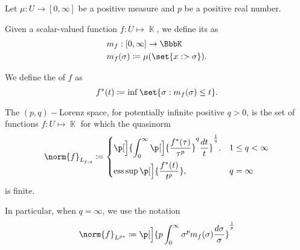 \begin{definition}\label{def:distribution_function}\cite[6]{Bergh1976}
  Let \( \mu: U \to [0, \infty] \) be a positive measure and \( p \) be a positive real number.

  \begin{defenum}
     Given a scalar-valued function \( f: U \mapsto \BbbK \), we define its  as
    \begin{align*}
      &m_f: [0, \infty] \to \BbbK \\
      &m_f(\sigma) \coloneqq \mu(\set{ x :  > \sigma }).
    \end{align*}

     We define the  of \( f \) as
    \begin{equation*}
      f^*(t) \coloneqq \inf\set{ \sigma : m_f(\sigma) \leq t }.
    \end{equation*}

     The \( (p, q)-\)Lorenz space, for potentially infinite positive \( q > 0 \), is the set of functions \( f: U \mapsto \BbbK \) for which the quasinorm
    \begin{equation*}
      \norm{f}_{L_{p,q}} \coloneqq \begin{dcases}
        \p[\Big]{\int_0^\infty \p[\Big]{\frac {f^*(\tau)} {\tau^p}}^q \frac {d t} t}^{\frac 1 q}, &1 \leq q < \infty \\
        \ess\sup\p[\Big]{\frac {f^*(t)} {t^p}}, &q = \infty
      \end{dcases}
    \end{equation*}
    is finite.

    In particular, when \( q = \infty \), we use the notation
    \begin{equation*}
      \norm{f}_{L^{p*}} \coloneqq \p[\Big]{p \int_0^\infty \sigma^p m_f(\sigma) \frac {d \sigma} \sigma}^{\frac 1 p}
    \end{equation*}
  \end{defenum}
\end{definition}

